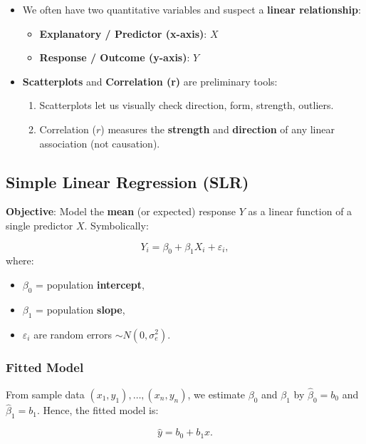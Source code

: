 \documentclass[10pt, total={6in, 8in}]{extarticle}
\begin{document}
\begin{itemize}
    \item We often have two quantitative variables and suspect a \textbf{linear relationship}:
          \begin{itemize}
              \item \textbf{Explanatory / Predictor (x-axis)}: $X$
              \item \textbf{Response / Outcome (y-axis)}: $Y$
          \end{itemize}
    \item \textbf{Scatterplots} and \textbf{Correlation (r)} are preliminary tools:
          \begin{enumerate}
              \item Scatterplots let us visually check direction, form, strength, outliers.
              \item Correlation ($r$) measures the \textbf{strength} and \textbf{direction} of any linear association (not causation).
          \end{enumerate}
\end{itemize}



\subsection{Simple Linear Regression (SLR)}

\textbf{Objective}: Model the \textbf{mean} (or expected) response $Y$ as a linear function of a single predictor $X$. Symbolically:

\[
    Y_i = \beta_0 + \beta_1 X_i + \varepsilon_i,
\]
where:
\begin{itemize}
    \item $\beta_0$ = population \textbf{intercept},
    \item $\beta_1$ = population \textbf{slope},
    \item $\varepsilon_i$ are random errors $\sim N(0,\sigma_e^2)$.
\end{itemize}

\subsubsection{Fitted Model}

From sample data $(x_1,y_1),\dots,(x_n,y_n)$, we estimate $\beta_0$ and $\beta_1$ by $\hat{\beta}_0 = b_0$ and $\hat{\beta}_1 = b_1$. Hence, the fitted model is:

\[
    \hat{y} = b_0 + b_1 x.
\]
\end{document}
